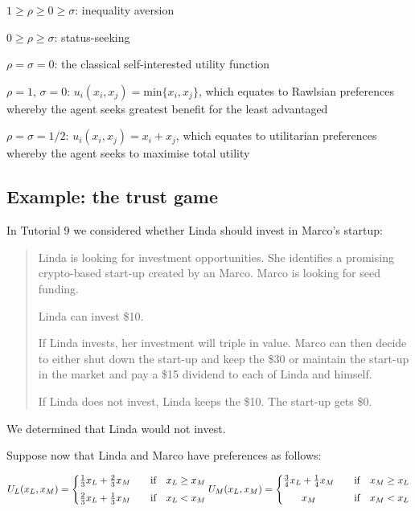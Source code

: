 \documentclass[
  letterpaper,
  DIV=11,
  numbers=noendperiod]{scrreprt}
\begin{document}
\(1≥\rho≥0≥\sigma\): inequality aversion

\(0≥\rho≥\sigma\): status-seeking

\(\rho=\sigma=0\): the classical self-interested utility function

\(\rho=1\), \(\sigma=0\): \(u_i(x_i,x_j)=\text{min}\{x_i,x_j\}\), which
equates to Rawlsian preferences whereby the agent seeks greatest benefit
for the least advantaged

\(\rho=\sigma=1/2\): \(u_i(x_i,x_j)=x_i+x_j\), which equates to
utilitarian preferences whereby the agent seeks to maximise total
utility

\hypertarget{example-the-trust-game}{%
\subsection{Example: the trust game}\label{example-the-trust-game}}

In Tutorial 9 we considered whether Linda should invest in Marco's
startup:

\begin{quote}
Linda is looking for investment opportunities. She identifies a
promising crypto-based start-up created by an Marco. Marco is looking
for seed funding.

Linda can invest \$10.

If Linda invests, her investment will triple in value. Marco can then
decide to either shut down the start-up and keep the \$30 or maintain
the start-up in the market and pay a \$15 dividend to each of Linda and
himself.

If Linda does not invest, Linda keeps the \$10. The start-up gets \$0.
\end{quote}

We determined that Linda would not invest.

Suppose now that Linda and Marco have preferences as follows:

\[
U_L(x_L,x_M)=\left\{\begin{matrix}
\frac{1}{3}x_L+\frac{2}{3}x_M \quad &\textrm{if} \quad x_L \geq x_M\\[6pt]
\frac{2}{3}x_L+\frac{1}{3}x_M \quad &\textrm{if} \quad x_L < x_M 
\end{matrix}\right. \\
\\[12pt]
U_M(x_L,x_M)=\left\{\begin{matrix}
\frac{3}{4}x_L+\frac{1}{4   }x_M \quad &\textrm{if} \quad x_M \geq x_L\\[6pt]
x_M \quad &\textrm{if} \quad x_M < x_L 
\end{matrix}\right.
\]
\end{document}
